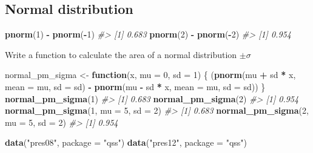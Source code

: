 \documentclass[]{book}
\newenvironment{Shaded}{\begin{snugshade}}{\end{snugshade}}
\newcommand{\KeywordTok}[1]{\textcolor[rgb]{0.13,0.29,0.53}{\textbf{#1}}}
\newcommand{\DataTypeTok}[1]{\textcolor[rgb]{0.13,0.29,0.53}{#1}}
\newcommand{\DecValTok}[1]{\textcolor[rgb]{0.00,0.00,0.81}{#1}}
\newcommand{\StringTok}[1]{\textcolor[rgb]{0.31,0.60,0.02}{#1}}
\newcommand{\CommentTok}[1]{\textcolor[rgb]{0.56,0.35,0.01}{\textit{#1}}}
\newcommand{\ControlFlowTok}[1]{\textcolor[rgb]{0.13,0.29,0.53}{\textbf{#1}}}
\newcommand{\OperatorTok}[1]{\textcolor[rgb]{0.81,0.36,0.00}{\textbf{#1}}}
\newcommand{\NormalTok}[1]{#1}
\theoremstyle{definition}
\theoremstyle{definition}
\theoremstyle{definition}
\theoremstyle{remark}
\begin{document}
\subsection{Normal distribution}\label{normal-distribution}

\begin{Shaded}
\begin{Highlighting}[]
\KeywordTok{pnorm}\NormalTok{(}\DecValTok{1}\NormalTok{) }\OperatorTok{-}\StringTok{ }\KeywordTok{pnorm}\NormalTok{(}\OperatorTok{-}\DecValTok{1}\NormalTok{)}
\CommentTok{#> [1] 0.683}
\KeywordTok{pnorm}\NormalTok{(}\DecValTok{2}\NormalTok{) }\OperatorTok{-}\StringTok{ }\KeywordTok{pnorm}\NormalTok{(}\OperatorTok{-}\DecValTok{2}\NormalTok{)}
\CommentTok{#> [1] 0.954}
\end{Highlighting}
\end{Shaded}

Write a function to calculate the area of a normal distribution
\(\pm \sigma\)

\begin{Shaded}
\begin{Highlighting}[]
\NormalTok{normal_pm_sigma <-}\StringTok{ }\ControlFlowTok{function}\NormalTok{(x, }\DataTypeTok{mu =} \DecValTok{0}\NormalTok{, }\DataTypeTok{sd =} \DecValTok{1}\NormalTok{) \{}
\NormalTok{  (}\KeywordTok{pnorm}\NormalTok{(mu }\OperatorTok{+}\StringTok{ }\NormalTok{sd }\OperatorTok{*}\StringTok{ }\NormalTok{x, }\DataTypeTok{mean =}\NormalTok{ mu, }\DataTypeTok{sd =}\NormalTok{ sd) }\OperatorTok{-}
\StringTok{     }\KeywordTok{pnorm}\NormalTok{(mu }\OperatorTok{-}\StringTok{ }\NormalTok{sd }\OperatorTok{*}\StringTok{ }\NormalTok{x, }\DataTypeTok{mean =}\NormalTok{ mu, }\DataTypeTok{sd =}\NormalTok{ sd))}
\NormalTok{\}}
\KeywordTok{normal_pm_sigma}\NormalTok{(}\DecValTok{1}\NormalTok{)}
\CommentTok{#> [1] 0.683}
\KeywordTok{normal_pm_sigma}\NormalTok{(}\DecValTok{2}\NormalTok{)}
\CommentTok{#> [1] 0.954}
\KeywordTok{normal_pm_sigma}\NormalTok{(}\DecValTok{1}\NormalTok{, }\DataTypeTok{mu =} \DecValTok{5}\NormalTok{, }\DataTypeTok{sd =} \DecValTok{2}\NormalTok{)}
\CommentTok{#> [1] 0.683}
\KeywordTok{normal_pm_sigma}\NormalTok{(}\DecValTok{2}\NormalTok{, }\DataTypeTok{mu =} \DecValTok{5}\NormalTok{, }\DataTypeTok{sd =} \DecValTok{2}\NormalTok{)}
\CommentTok{#> [1] 0.954}
\end{Highlighting}
\end{Shaded}

\begin{Shaded}
\begin{Highlighting}[]
\KeywordTok{data}\NormalTok{(}\StringTok{"pres08"}\NormalTok{, }\DataTypeTok{package =} \StringTok{"qss"}\NormalTok{)}
\KeywordTok{data}\NormalTok{(}\StringTok{"pres12"}\NormalTok{, }\DataTypeTok{package =} \StringTok{"qss"}\NormalTok{)}
\end{Highlighting}
\end{Shaded}
\end{document}

